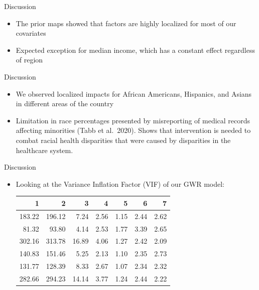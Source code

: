 \documentclass[
  ignorenonframetext,
]{beamer}
\begin{document}
\begin{frame}{Discussion}
\label{discussion-1}
\begin{itemize}
\item
  The prior maps showed that factors are highly localized for most of
  our covariates
\item
  Expected exception for median income, which has a constant effect
  regardless of region
\end{itemize}
\end{frame}

\begin{frame}{Discussion}
\label{discussion-2}
\begin{itemize}
\item
  We observed localized impacts for African Americans, Hispanics, and
  Asians in different areas of the country
\item
  Limitation in race percentages presented by misreporting of medical
  records affecting minorities (Tabb et al.~2020). Shows that
  intervention is needed to combat racial health disparities that were
  caused by disparities in the healthcare system.
\end{itemize}
\end{frame}

\begin{frame}{Discussion}
\label{discussion-3}
\begin{itemize}
\item
  Looking at the Variance Inflation Factor (VIF) of our GWR model:

  \begin{table}[ht] \centering \begin{tabular}{rrrrrrr}   \hline 1 & 2 & 3 & 4 & 5 & 6 & 7 \\    \hline 183.22 & 196.12 & 7.24 & 2.56 & 1.15 & 2.44 & 2.62 \\    81.32 & 93.80 & 4.14 & 2.53 & 1.77 & 3.39 & 2.65 \\    302.16 & 313.78 & 16.89 & 4.06 & 1.27 & 2.42 & 2.09 \\    140.83 & 151.46 & 5.25 & 2.13 & 1.10 & 2.35 & 2.73 \\    131.77 & 128.39 & 8.33 & 2.67 & 1.07 & 2.34 & 2.32 \\    282.66 & 294.23 & 14.14 & 3.77 & 1.24 & 2.44 & 2.22 \\     \hline \end{tabular} \end{table}
\end{itemize}
\end{frame}
\end{document}
